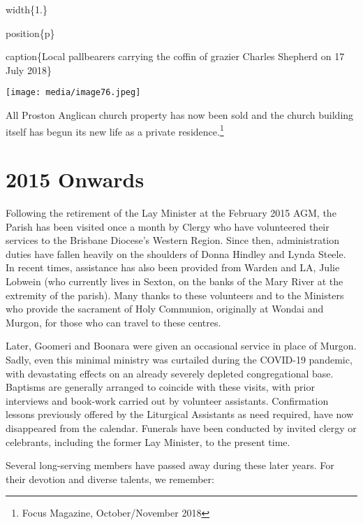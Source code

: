 width\{1.\}

position\{p\}

caption\{Local pallbearers carrying the coffin of grazier Charles Shepherd on 17 July 2018\}

\texttt{[image: media/image76.jpeg]}

All Proston Anglican church property has now been sold and the church building itself has begun its new life as a private residence.\footnote{Focus Magazine, October/November 2018}

\hypertarget{onwards}{%
\section{2015 Onwards}\label{onwards}}

Following the retirement of the Lay Minister at the February 2015 AGM, the Parish has been visited once a month by Clergy who have volunteered their services to the Brisbane Diocese's Western Region. Since then, administration duties have fallen heavily on the shoulders of Donna Hindley and Lynda Steele. In recent times, assistance has also been provided from Warden and LA, Julie Lobwein (who currently lives in Sexton, on the banks of the Mary River at the extremity of the parish). Many thanks to these volunteers and to the Ministers who provide the sacrament of Holy Communion, originally at Wondai and Murgon, for those who can travel to these centres.

Later, Goomeri and Boonara were given an occasional service in place of Murgon. Sadly, even this minimal ministry was curtailed during the COVID-19 pandemic, with devastating effects on an already severely depleted congregational base. Baptisms are generally arranged to coincide with these visits, with prior interviews and book-work carried out by volunteer assistants. Confirmation lessons previously offered by the Liturgical Assistants as need required, have now disappeared from the calendar. Funerals have been conducted by invited clergy or celebrants, including the former Lay Minister, to the present time.

Several long-serving members have passed away during these later years. For their devotion and diverse talents, we remember:

